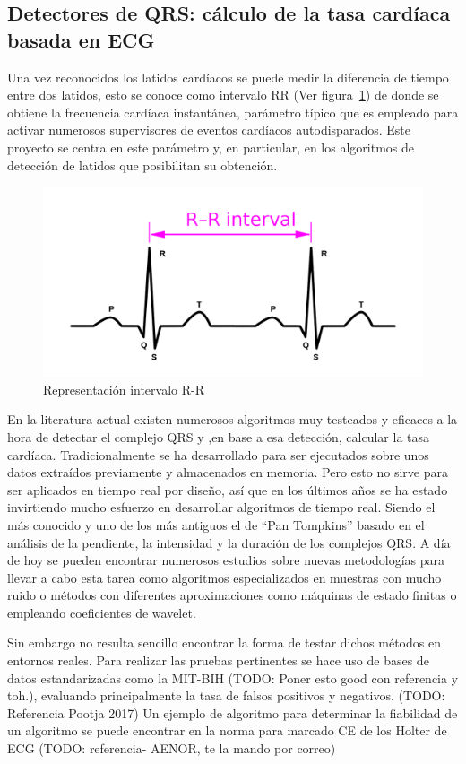 \subsection{Detectores de QRS: cálculo de la tasa cardíaca basada en ECG}

Una vez reconocidos los latidos cardíacos se puede medir la diferencia de tiempo entre dos latidos, esto se conoce como intervalo RR (Ver figura~\ref{fig:RRInterval})  de donde se obtiene la frecuencia cardíaca instantánea, parámetro típico que es empleado para activar numerosos supervisores de eventos cardíacos autodisparados. Este proyecto se centra en este parámetro y, en particular, en los algoritmos de detección de latidos que posibilitan su obtención.  

\begin{figure}[ht]
	\centering
		\includegraphics[width=0.6\linewidth]{figuras/RRInterval.png}
	\caption{Representación intervalo R-R}
	\label{fig:RRInterval}
\end{figure} 

\clearpage
En la literatura actual existen numerosos algoritmos muy testeados y eficaces a la hora de detectar el complejo QRS y ,en base a esa detección, calcular la tasa cardíaca. Tradicionalmente se ha desarrollado para ser ejecutados sobre unos datos extraídos previamente y almacenados en memoria. Pero esto no sirve para ser aplicados en tiempo real por diseño, así que en los últimos años se ha estado invirtiendo mucho esfuerzo en desarrollar algoritmos de tiempo real. Siendo el más conocido y uno de los más antiguos el de “Pan Tompkins” basado en el análisis de la pendiente, la intensidad y la duración de los complejos QRS.\cite{PanTompkins} A día de hoy se pueden encontrar numerosos estudios sobre nuevas metodologías para llevar a cabo esta tarea como algoritmos especializados en muestras con mucho ruido\cite{RsSlope} o métodos con diferentes aproximaciones como máquinas de estado finitas\cite{FSM} o empleando coeficientes de wavelet.\cite{Wavelet}

Sin embargo no resulta sencillo encontrar la forma de testar dichos métodos en entornos reales. Para realizar las pruebas pertinentes se hace uso de bases de datos estandarizadas como la MIT-BIH (TODO: Poner esto good con referencia y toh.), evaluando principalmente la tasa de falsos positivos y negativos. (TODO: Referencia Pootja 2017) Un ejemplo de algoritmo para determinar la fiabilidad de un algoritmo se puede encontrar en la norma para marcado CE de los Holter de ECG (TODO: referencia- AENOR, te la mando por correo)

